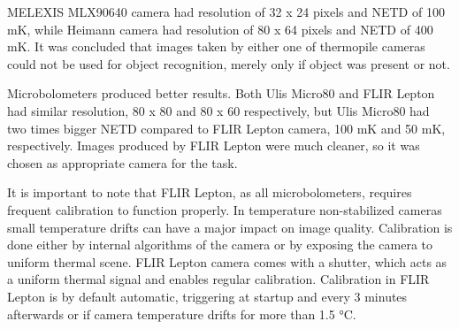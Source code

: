 MELEXIS MLX90640 camera had resolution of 32 x 24 pixels and NETD of 100 \si{\milli\kelvin}, while Heimann camera had resolution of 80 x 64 pixels and NETD of 400 \si{\milli\kelvin}.
It was concluded that images taken by either one of thermopile cameras could not be used for object recognition, merely only if object was present or not\cite{thermal_comparison}.

Microbolometers produced better results.
Both Ulis Micro80 and FLIR Lepton had similar resolution, 80 x 80 and 80 x 60 respectively, but Ulis Micro80 had two times bigger NETD compared to FLIR Lepton camera, 100 \si{\milli\kelvin} and 50 \si{\milli\kelvin}, respectively.
Images produced by FLIR Lepton were much cleaner, so it was chosen as appropriate camera for the task.

It is important to note that FLIR Lepton, as all microbolometers, requires frequent calibration to function properly.
In temperature non-stabilized cameras small temperature drifts can have a major impact on image quality\cite{thermal_book}.
Calibration is done either by internal algorithms of the camera or by exposing the camera to uniform thermal scene.
FLIR Lepton camera comes with a shutter, which acts as a uniform thermal signal and enables regular calibration.
Calibration in FLIR Lepton is by default automatic, triggering at startup and every 3 minutes afterwards or if camera temperature drifts for more than 1.5 \si{\celsius}.
